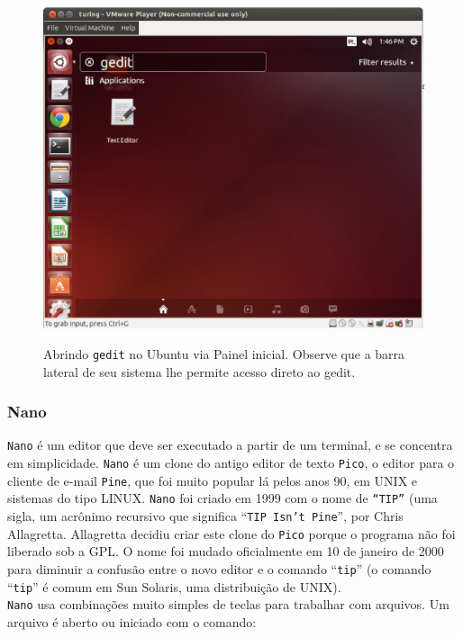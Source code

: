 \begin{refsection}
  \begin{figure}[H]
      {\includegraphics[scale=0.35]{figures/tut2/gedit.eps}}
      {\caption[\textit{Abrindo \texttt{gedit} }]{Abrindo \texttt{gedit} no Ubuntu via Painel inicial. Observe que a barra lateral de seu sistema lhe permite acesso direto ao gedit.}\label{tut2:fig:gedit}}
  \end{figure}


\subsubsection{Nano}\label{tut2:text:editors:nano}

\texttt{Nano} é um editor que deve ser executado a partir de um terminal, e se concentra em simplicidade. \texttt{Nano} é um clone do antigo editor de texto \texttt{Pico}, o editor para o cliente de e-mail \texttt{Pine}, que foi muito popular lá pelos anos 90, em UNIX e sistemas do tipo LINUX. \texttt{Nano} foi criado em 1999 com o nome de \texttt{``TIP''} (uma sigla, um acrônimo recursivo que significa ``\texttt{TIP Isn't Pine}'', por Chris Allagretta. Allagretta decidiu criar este clone do \texttt{Pico} porque o programa não foi liberado sob a GPL. O nome foi mudado oficialmente em 10 de janeiro de 2000 para diminuir a confusão entre o novo editor e o comando ``\texttt{tip}'' (o comando ``\texttt{tip}'' é comum em Sun Solaris, uma distribuição de UNIX).\\
\texttt{Nano} usa combinações muito simples de teclas para trabalhar com arquivos. Um arquivo é aberto ou iniciado com o comando: \\


\end{refsection}
